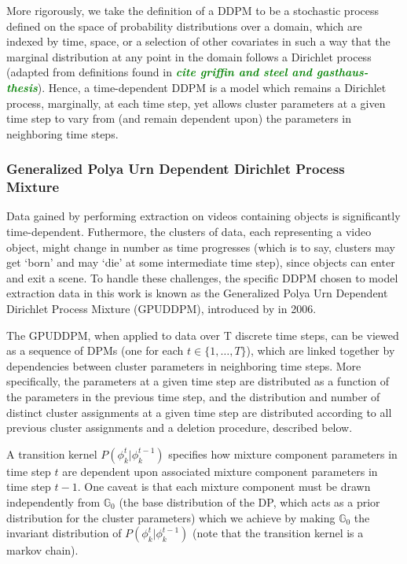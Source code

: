 \documentclass[smallcondensed, final]{svjour3}
\newcommand{\willie}[1]{\textcolor{green}{\textsf{\emph{\textbf{\textcolor{green}{#1}}}}}}
\begin{document}
More rigorously, we take the definition of a DDPM to be a stochastic process defined on the space of probability distributions over a domain, which are indexed by time, space, or a selection of other covariates in such a way that the marginal distribution at any point in the domain follows a Dirichlet process (adapted from definitions found in \willie{cite griffin and steel and gasthaus-thesis}). Hence, a time-dependent DDPM is a model which remains a Dirichlet process, marginally, at each time step, yet allows cluster parameters at a given time step to vary from (and remain dependent upon) the parameters in neighboring time steps.



\subsubsection{Generalized Polya Urn Dependent Dirichlet Process Mixture}
\label{sec:gpudpm}

Data gained by performing extraction on videos containing objects is significantly time-dependent. Futhermore, the clusters of data, each representing a video object, might change in number as time progresses (which is to say, clusters may get `born' and may `die' at some intermediate time step), since objects can enter and exit a scene. To handle these challenges, the specific DDPM chosen to model extraction data in this work is known as the Generalized Polya Urn Dependent Dirichlet Process Mixture (GPUDDPM), introduced by \cite{caron_2007} in 2006.

The GPUDDPM, when applied to data over T discrete time steps, can be viewed as a sequence of DPMs (one for each $t \in \{1, \ldots, T \}$), which are linked together by dependencies between cluster parameters in neighboring time steps. More specifically, the parameters at a given time step are distributed as a function of the parameters in the previous time step, and the distribution and number of distinct cluster assignments at a given time step are distributed according to all previous cluster assignments and a deletion procedure, described below.

A transition kernel $P(\phi_{k}^{t} | \phi_{k}^{t-1})$ specifies how mixture component parameters in time step $t$ are dependent upon associated mixture component parameters in time step $t-1$. One caveat is that each mixture component must be drawn independently from $\mathbb{G}_{0}$ (the base distribution of the DP, which acts as a prior distribution for the cluster parameters) which we achieve by making $\mathbb{G}_{0}$ the invariant distribution of $P(\phi_{k}^{t} | \phi_{k}^{t-1})$ (note that the transition kernel is a markov chain). 
\end{document}
